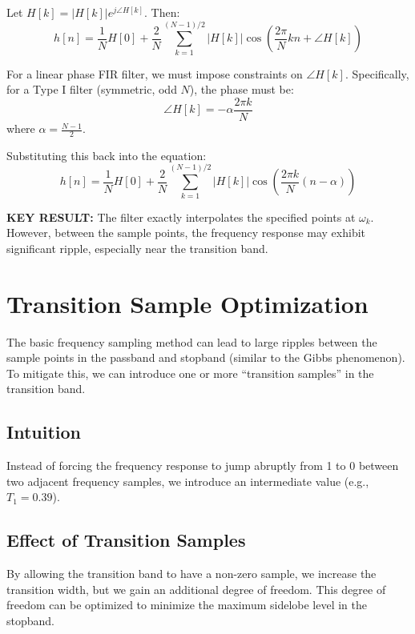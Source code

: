 \documentclass[11pt,a4paper]{article}
\begin{document}
Let $H[k] = |H[k]| e^{j \angle H[k]}$. Then:
\begin{equation}
h[n] = \frac{1}{N} H[0] + \frac{2}{N} \sum_{k=1}^{(N-1)/2} |H[k]| \cos\left(\frac{2\pi}{N} kn + \angle H[k]\right)
\end{equation}

For a linear phase FIR filter, we must impose constraints on $\angle H[k]$. Specifically, for a Type I filter (symmetric, odd $N$), the phase must be:
\begin{equation}
\angle H[k] = - \alpha \frac{2\pi k}{N}
\end{equation}
where $\alpha = \frac{N-1}{2}$.

Substituting this back into the equation:
\begin{equation}
h[n] = \frac{1}{N} H[0] + \frac{2}{N} \sum_{k=1}^{(N-1)/2} |H[k]| \cos\left(\frac{2\pi k}{N} (n - \alpha)\right)
\end{equation}

\textbf{KEY RESULT:} The filter exactly interpolates the specified points at $\omega_k$. However, between the sample points, the frequency response may exhibit significant ripple, especially near the transition band.

\section{Transition Sample Optimization}

The basic frequency sampling method can lead to large ripples between the sample points in the passband and stopband (similar to the Gibbs phenomenon). To mitigate this, we can introduce one or more ``transition samples'' in the transition band.

\subsection{Intuition}
Instead of forcing the frequency response to jump abruptly from 1 to 0 between two adjacent frequency samples, we introduce an intermediate value (e.g., $T_1 = 0.39$).

\subsection{Effect of Transition Samples}
By allowing the transition band to have a non-zero sample, we increase the transition width, but we gain an additional degree of freedom. This degree of freedom can be optimized to minimize the maximum sidelobe level in the stopband.
\end{document}
